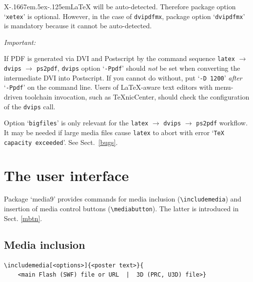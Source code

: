 \documentclass[a4paper]{article}
\def\XeLaTeX{X\kern-.1667em\lower.5ex\hbox{\reflectbox{E}}\kern-.125em\LaTeX}
\begin{document}
\XeLaTeX{} will be auto-detected. Therefore package option `\verb+xetex+' is optional. However, in the case of  \verb+dvipdfmx+, package option `\verb+dvipdfmx+' is mandatory because it cannot be auto-detected.

\begin{animateinline}{1}\strut\emph{Important:}\newframe[3]\end{animateinline} If PDF is generated via DVI and Postscript by the command sequence \verb+latex+ $\rightarrow$ \verb+dvips+ $\rightarrow$ \verb+ps2pdf+, \verb+dvips+ option `\verb+-Ppdf+' should \emph{not} be set when converting the intermediate DVI into Postscript. If you cannot do without, put `\verb+-D 1200+' \emph{after} `\verb+-Ppdf+' on the command line. Users of \LaTeX-aware text editors with menu-driven toolchain invocation, such as \TeX{}nicCenter, should check the configuration of the \verb+dvips+ call.

Option `\verb+bigfiles+' is only relevant for the \verb+latex+ $\rightarrow$ \verb+dvips+ $\rightarrow$ \verb+ps2pdf+ workflow. It may be needed if large media files cause \verb+latex+ to abort with error `\verb+TeX capacity exceeded+'. See Sect.\ \ref{bugs}.

\section{The user interface}
Package `media9' provides commands for media inclusion (\verb+\includemedia+) and insertion of media control buttons (\verb+\mediabutton+). The latter is introduced in Sect. \ref{mbtn}.

\subsection{Media inclusion}
\begin{verbatim}
\includemedia[<options>]{<poster text>}{
    <main Flash (SWF) file or URL  |  3D (PRC, U3D) file>}
\end{verbatim}
\end{document}
